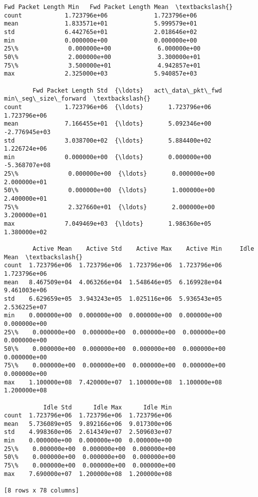 \documentclass[11pt]{article}
\begin{document}
\begin{tcolorbox}[breakable, size=fbox, boxrule=.5pt, pad at break*=1mm, opacityfill=0]
\begin{Verbatim}[commandchars=\\\{\}]
        Fwd Packet Length Min   Fwd Packet Length Mean  \textbackslash{}
count            1.723796e+06             1.723796e+06
mean             1.833571e+01             5.999579e+01
std              6.442765e+01             2.018646e+02
min              0.000000e+00             0.000000e+00
25\%              0.000000e+00             6.000000e+00
50\%              2.000000e+00             3.300000e+01
75\%              3.500000e+01             4.942857e+01
max              2.325000e+03             5.940857e+03

        Fwd Packet Length Std  {\ldots}   act\_data\_pkt\_fwd   min\_seg\_size\_forward  \textbackslash{}
count            1.723796e+06  {\ldots}       1.723796e+06           1.723796e+06
mean             7.166455e+01  {\ldots}       5.092346e+00          -2.776945e+03
std              3.038700e+02  {\ldots}       5.884400e+02           1.226724e+06
min              0.000000e+00  {\ldots}       0.000000e+00          -5.368707e+08
25\%              0.000000e+00  {\ldots}       0.000000e+00           2.000000e+01
50\%              0.000000e+00  {\ldots}       1.000000e+00           2.400000e+01
75\%              2.327660e+01  {\ldots}       2.000000e+00           3.200000e+01
max              7.049469e+03  {\ldots}       1.986360e+05           1.380000e+02

        Active Mean    Active Std    Active Max    Active Min     Idle Mean  \textbackslash{}
count  1.723796e+06  1.723796e+06  1.723796e+06  1.723796e+06  1.723796e+06
mean   8.467509e+04  4.063266e+04  1.548646e+05  6.169928e+04  9.461003e+06
std    6.629659e+05  3.943243e+05  1.025116e+06  5.936543e+05  2.536225e+07
min    0.000000e+00  0.000000e+00  0.000000e+00  0.000000e+00  0.000000e+00
25\%    0.000000e+00  0.000000e+00  0.000000e+00  0.000000e+00  0.000000e+00
50\%    0.000000e+00  0.000000e+00  0.000000e+00  0.000000e+00  0.000000e+00
75\%    0.000000e+00  0.000000e+00  0.000000e+00  0.000000e+00  0.000000e+00
max    1.100000e+08  7.420000e+07  1.100000e+08  1.100000e+08  1.200000e+08

           Idle Std      Idle Max      Idle Min
count  1.723796e+06  1.723796e+06  1.723796e+06
mean   5.736089e+05  9.892166e+06  9.017300e+06
std    4.998360e+06  2.614349e+07  2.509603e+07
min    0.000000e+00  0.000000e+00  0.000000e+00
25\%    0.000000e+00  0.000000e+00  0.000000e+00
50\%    0.000000e+00  0.000000e+00  0.000000e+00
75\%    0.000000e+00  0.000000e+00  0.000000e+00
max    7.690000e+07  1.200000e+08  1.200000e+08

[8 rows x 78 columns]
\end{Verbatim}
\end{tcolorbox}
        
\end{document}
